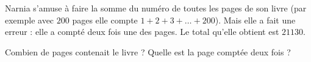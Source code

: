 
\begin{exercice}\label{exosmath-0543}

    Narnia s'amuse à faire la somme du numéro de toutes les pages de son livre (par exemple avec \( 200\) pages elle compte \( 1+2+3+\ldots+200\)). Mais elle a fait une erreur : elle a compté deux fois une des pages. Le total qu'elle obtient est \( 21130\).

    Combien de pages contenait le livre ? Quelle est la page comptée deux fois ?

\end{exercice}
